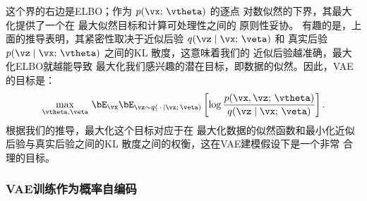 \documentclass[../../book-main.tex]{subfiles}
\begin{document}
这个界的右边是ELBO；作为 $p(\vx;\, \vtheta)$ 的逐点
对数似然的下界，其最大化提供了一个在
最大似然目标和计算可处理性之间的
原则性妥协。
有趣的是，上面的推导表明，其紧密性取决于近似后验 $q(\vz \mid \vx;\, \veta)$ 和
真实后验 $p(\vz \mid \vx;\, \vtheta)$ 之间的KL
散度，这意味着我们的
近似后验越准确，最大化ELBO就越能导致
最大化我们感兴趣的潜在目标，即数据的似然。因此，VAE的目标是：
\begin{equation}\label{eq:elbo-objective}
\max_{\vtheta, \veta}\,
\bE_{\vx}
\bE_{\vz \sim q(\,\cdot\, \mid \vx ;\, \veta)} \left[
  \log \frac{p(\vx, \vz;\, \vtheta)}{q(\vz \mid \vx;\, \veta)}
\right].
\end{equation}
根据我们的推导，最大化这个目标对应于在
最大化数据的似然函数和最小化近似后验与真实后验之间的KL
散度之间的权衡，这在VAE建模假设下是一个非常
合理的目标。

\subsubsection{VAE训练作为概率自编码}
\end{document}

